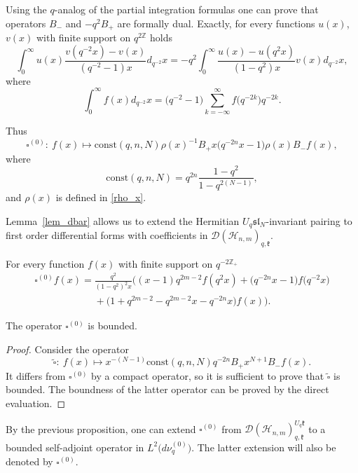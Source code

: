 Using the $q$-analog of the partial integration formulas one can prove that operators $B_-$ and $-q^2 B_+$
are formally dual. Exactly, for every functions $u(x)$, $v(x)$ with f\/inite support on $q^{2\mathbb{Z}}$ holds
\[ \int_0^\infty u(x) \frac{v(q^{-2}x)-v(x)}{(q^{-2}-1)x} d_{q^{-2}} x = -q^2 \int_0^\infty
\frac{u(x)-u(q^2x)}{(1-q^2)x} v(x) d_{q^{-2}} x,
\]
where
\[
\int_0^\infty f(x) d_{q^{-2}} x = \big(q^{-2} - 1\big)
\sum\limits_{k=-\infty}^\infty f\big(q^{-2k}\big) q^{-2k}.
\]

Thus
\[
\square^{(0)}: \ f(x) \mapsto \mathrm{const}(q, n, N) \rho(x)^{-1} B_+ x \big(q^{-2n} x - 1\big) \rho(x) B_- f(x),
\]
where
\[
\mathrm{const}(q, n, N) = q^{2n} \frac{1-q^2}{1-q^{2(N-1)}},
\]
and $\rho(x)$ is def\/ined in \eqref{rho_x}.

Lemma~\ref{lem_dbar} allows us to extend the Hermitian $U_q
\mathfrak{sl}_N$-invariant pairing to f\/irst order dif\/ferential forms with
coef\/f\/icients in $\mathscr{D}(\mathscr{H}_{n,m})_{q,\mathfrak{k}}$.

\begin{lemma}
For every function $f(x)$ with finite support on $q^{-2\mathbb{Z}_+}$
\begin{gather*}
\square^{(0)} f(x) = \frac{q^2}{(1-q^2)^2x} \big((x-1)q^{2m-2}f(q^2x) +
\big(q^{-2n}x-1\big)f\big(q^{-2}x\big)\\
\phantom{\square^{(0)} f(x) =}{}
+\big(1+q^{2m-2}-q^{2m-2}x-q^{-2n}x\big)f(x)\big).
\end{gather*}
\end{lemma}

\begin{proposition}\label{cont_spec}
The operator $\square^{(0)}$ is bounded.
\end{proposition}

\begin{proof} Consider the operator
\[
\widetilde{\square} : \ f(x) \mapsto x^{-(N-1)} \mathrm{const}(q, n, N) q^{-2n} B_+ x^{N+1} B_-f(x).
\]
It dif\/fers from $\square^{(0)}$ by a compact operator, so it is suf\/f\/icient to prove that
$\widetilde{\square}$ is bounded. The boundness of the latter operator can be proved by the direct
evaluation.
\end{proof}

By the previous proposition, one can extend $\square^{(0)}$ from
$\mathscr{D}(\mathscr{H}_{n,m})_{q,\mathfrak{k}}^{U_q \mathfrak{k}}$ to a bounded self-adjoint operator in
$L^2\big(d\nu_q^{(0)}\big)$. The latter extension will also be denoted by $\square^{(0)}$.


